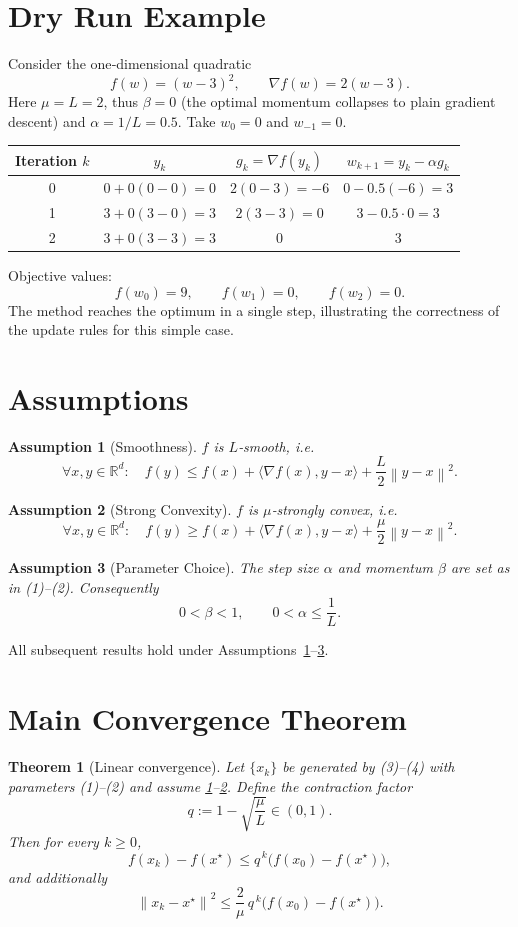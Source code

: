 \documentclass{article}
\newtheorem{theorem}{Theorem}
\newtheorem{assumption}{Assumption}
\newcommand{\grad}{\nabla}
\newcommand{\R}{\mathbb{R}}
\newcommand{\norm}[1]{\left\|#1\right\|}
\newcommand{\ip}[2]{\langle #1,#2\rangle}
\begin{document}
\section*{Dry Run Example}
Consider the one‑dimensional quadratic
\[
f(w)=(w-3)^{2},\qquad \grad f(w)=2(w-3).
\]
Here $\mu=L=2$, thus $\beta=0$ (the optimal momentum collapses to plain gradient descent) and $\alpha=1/L=0.5$.
Take $w_{0}=0$ and $w_{-1}=0$.

\begin{center}
\begin{tabular}{c|c|c|c}
Iteration $k$ & $y_{k}$ & $g_{k}=\grad f(y_{k})$ & $w_{k+1}=y_{k}-\alpha g_{k}$ \\ \midrule
0 & $0+0(0-0)=0$ & $2(0-3)=-6$ & $0-0.5(-6)=3$ \\
1 & $3+0(3-0)=3$ & $2(3-3)=0$   & $3-0.5\cdot0=3$ \\
2 & $3+0(3-3)=3$ & $0$          & $3$ \\
\end{tabular}
\end{center}
Objective values:
\[
f(w_{0})=9,\qquad f(w_{1})=0,\qquad f(w_{2})=0.
\]
The method reaches the optimum in a single step, illustrating the correctness of the update rules for this simple case.
\section*{Assumptions}
\begin{assumption}[Smoothness]\label{as:smooth}
$f$ is $L$‑smooth, i.e.
\[
\forall x,y\in\R^{d}:\quad
f(y)\le f(x)+\ip{\grad f(x)}{y-x}+\frac{L}{2}\norm{y-x}^{2}. \tag{5}
\]
\end{assumption}
\begin{assumption}[Strong Convexity]\label{as:strong}
$f$ is $\mu$‑strongly convex, i.e.
\[
\forall x,y\in\R^{d}:\quad
f(y)\ge f(x)+\ip{\grad f(x)}{y-x}+\frac{\mu}{2}\norm{y-x}^{2}. \tag{6}
\]
\end{assumption}
\begin{assumption}[Parameter Choice]\label{as:param}
The step size $\alpha$ and momentum $\beta$ are set as in (1)–(2).  Consequently
\[
0<\beta<1,\qquad 0<\alpha\le\frac{1}{L}. \tag{7}
\]
\end{assumption}
All subsequent results hold under Assumptions~\ref{as:smooth}–\ref{as:param}.
\section*{Main Convergence Theorem}
\begin{theorem}[Linear convergence]\label{thm:linear}
Let $\{x_{k}\}$ be generated by (3)–(4) with parameters (1)–(2) and assume
\ref{as:smooth}–\ref{as:strong}.  Define the contraction factor
\[
q:=1-\sqrt{\frac{\mu}{L}}\in(0,1). \tag{8}
\]
Then for every $k\ge 0$,
\[
f(x_{k})-f(x^{\star})\le q^{\,k}\bigl(f(x_{0})-f(x^{\star})\bigr), \tag{9}
\]
and additionally
\[
\norm{x_{k}-x^{\star}}^{2}\le \frac{2}{\mu}\,q^{\,k}\bigl(f(x_{0})-f(x^{\star})\bigr). \tag{10}
\]
\end{theorem}
\end{document}
